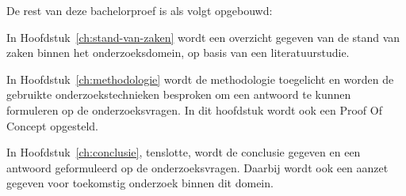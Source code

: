 
De rest van deze bachelorproef is als volgt opgebouwd:

In Hoofdstuk~\ref{ch:stand-van-zaken} wordt een overzicht gegeven van de stand van zaken binnen het onderzoeksdomein, op basis van een literatuurstudie.

In Hoofdstuk~\ref{ch:methodologie} wordt de methodologie toegelicht en worden de gebruikte onderzoekstechnieken besproken om een antwoord te kunnen formuleren op de onderzoeksvragen. In dit hoofdstuk wordt ook een Proof Of Concept opgesteld.


In Hoofdstuk~\ref{ch:conclusie}, tenslotte, wordt de conclusie gegeven en een antwoord geformuleerd op de onderzoeksvragen. Daarbij wordt ook een aanzet gegeven voor toekomstig onderzoek binnen dit domein.